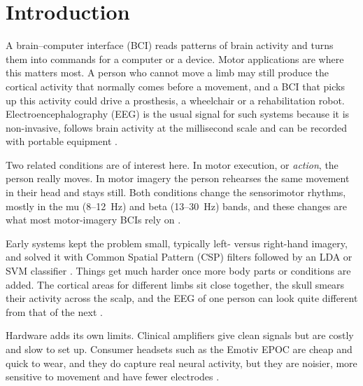 \documentclass[pdflatex,sn-mathphys-num]{sn-jnl}%
\theoremstyle{thmstyleone}%
\theoremstyle{thmstyletwo}%
\theoremstyle{thmstylethree}%
\begin{document}

\maketitle

\section{Introduction}\label{sec1}

A brain--computer interface (BCI) reads patterns of brain activity and turns them into commands for a computer or a device. Motor applications are where this matters most. A person who cannot move a limb may still produce the cortical activity that normally comes before a movement, and a BCI that picks up this activity could drive a prosthesis, a wheelchair or a rehabilitation robot. Electroencephalography (EEG) is the usual signal for such systems because it is non-invasive, follows brain activity at the millisecond scale and can be recorded with portable equipment \citep{Wolpaw2002,NicolasAlonso2012}.

Two related conditions are of interest here. In motor execution, or \emph{action}, the person really moves. In motor imagery the person rehearses the same movement in their head and stays still. Both conditions change the sensorimotor rhythms, mostly in the mu (8--12~Hz) and beta (13--30~Hz) bands, and these changes are what most motor-imagery BCIs rely on \citep{Pfurtscheller2001,PfurtschellerAranibar1977}.

Early systems kept the problem small, typically left- versus right-hand imagery, and solved it with Common Spatial Pattern (CSP) filters followed by an LDA or SVM classifier \citep{Ramoser2000,Blankertz2008}. Things get much harder once more body parts or conditions are added. The cortical areas for different limbs sit close together, the skull smears their activity across the scalp, and the EEG of one person can look quite different from that of the next \citep{Naeem2006,Lotte2018}.

Hardware adds its own limits. Clinical amplifiers give clean signals but are costly and slow to set up. Consumer headsets such as the Emotiv EPOC are cheap and quick to wear, and they do capture real neural activity, but they are noisier, more sensitive to movement and have fewer electrodes \citep{Badcock2013,Duvinage2013,Maskeliunas2016}.
\end{document}
